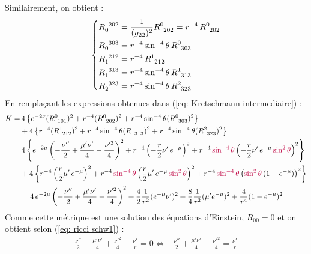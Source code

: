 Similairement, on obtient :
\begin{align}
    \begin{dcases}
        R\indices{_0^{202}} = \frac{1}{(g_{22})^2} R\indices{^0_{202}} = r^{-4} \,R\indices{^0_{202}}\\
        R\indices{_0^{303}} = r^{-4} \sin^{-4} \theta \, R\indices{^0_{303}} \\
        R\indices{_1^{212}} = r^{-4} \, R\indices{^1_{212}}\\
        R\indices{_1^{313}} = r^{-4} \sin^{-4} \theta \, R\indices{^1_{313}} \\
        R\indices{_2^{323}} = r^{-4} \sin^{-4} \theta \, R\indices{^2_{323}}
    \end{dcases}
\end{align}
En remplaçant les expressions obtenues dans (\ref{eq: Kretschmann intermediaire}) :
\begin{align*}
    K=& \, 4 \ltc e^{-2\nu} (R\indices{^0_{101}})^2 + r^{-4} (R\indices{^0_{202}})^2 + r^{-4} \sin^{-4} \theta (R\indices{^0_{303}})^2 \rtc \\
    &+ 4 \ltc r^{-4} (R\indices{^1_{212}})^2 + r^{-4} \sin^{-4} \theta (R\indices{^1_{313}})^2 + r^{-4} \sin^{-4} \theta (R\indices{^2_{323}})^2 \rtc\\
    =& \, 4 \ltc e^{-2\mu} \left(-\frac{\nu''}{2} + \frac{\mu' \nu'}{4} - \frac{\nu'^2}{4} \right)^2 + r^{-4} \left( - \frac{r}{2} \nu' \, e^{-\mu}\right)^2 + r^{-4}\, \purple{\sin^{-4} \theta} \lt - \frac{r}{2} \nu' \,e^{-\mu} \, \purple{\sin^2\theta}  \rt^2 \rtc \\
    & + 4 \ltc r^{-4} \left( \frac{r}{2}\mu'\, e^{-\mu} \right)^2 + r^{-4} \,\purple{\sin^{-4}\theta} \left( \frac{r}{2} \mu' \, e^{-\mu} \, \purple{\sin^2 \theta} \right)^2 + r^{-4} \,\purple{\sin^{-4} \theta} \left( \purple{\sin^2\theta}\, (1- e^{-\mu}) \right)^2 \rtc \\
    &= 4 \, e^{-2\mu} \left( -\frac{\nu''}{2} + \frac{\mu'\nu'}{4} - \frac{\nu'^2}{4} \right)^2 + \frac{4}{2} \frac{1}{r^2} (e^{-\mu} \nu')^2 + \frac{8}{4} \frac{1}{r^2} (\mu' e^{-\mu})^2 + \frac{4}{r^4} (1 - e^{-\mu})^2
\end{align*}
Comme cette métrique est une solution des équations d'Einstein, $R_{00} = 0$ et on obtient selon (\ref{eq: ricci schw1}) :
\begin{align*}
    \frac{\nu ''}{2} - \frac{\mu ' \nu '}{4} + \frac{\nu'^2}{4} + \frac{\nu '}{r} = 0 \iff -\frac{\nu ''}{2} + \frac{\mu ' \nu '}{4} - \frac{\nu'^2}{4} = \frac{\nu '}{r}
\end{align*}
